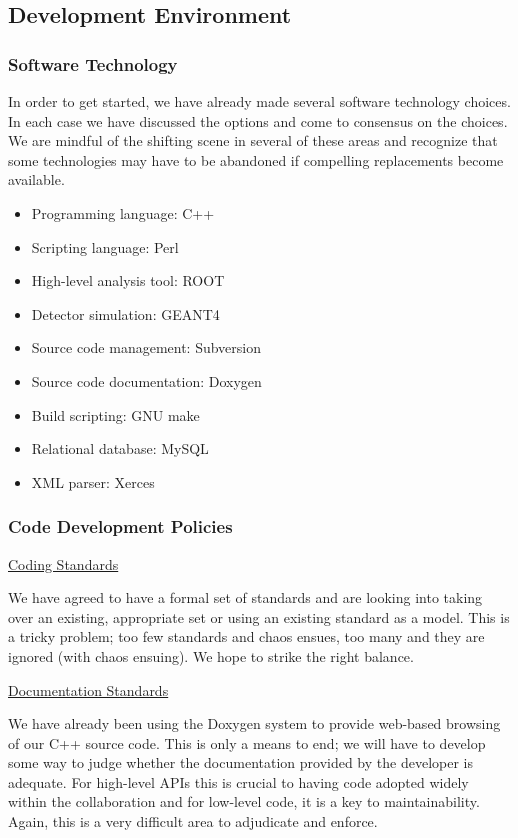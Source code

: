 \documentclass[12pt]{article}
\begin{document}
\subsection{Development Environment}

\subsubsection{Software Technology}

In order to get started, we have already made several software technology 
choices. In each case we have discussed the options and come to consensus on 
the choices. We are mindful of the shifting scene in several of these areas 
and recognize that some technologies may have to be abandoned if compelling 
replacements become available.

\begin{itemize}
\item Programming language: C++
\item Scripting language: Perl
\item High-level analysis tool: ROOT
\item Detector simulation: GEANT4
\item Source code management: Subversion
\item Source code documentation: Doxygen
\item Build scripting: GNU make
\item Relational database: MySQL
\item XML parser: Xerces
\end{itemize}

\subsubsection{Code Development Policies}

\noindent
\underline{Coding Standards}

We have agreed to have a formal set of standards and are looking into taking 
over an existing, appropriate set or using an existing standard as a model. 
This is a tricky problem; too few standards and chaos ensues, too many and 
they are ignored (with chaos ensuing). We hope to strike the right balance.

\vskip 0.3cm

\noindent
\underline{Documentation Standards}

We have already been using the Doxygen system to provide web-based browsing 
of our C++ source code. This is only a means to end; we will have to develop 
some way to judge whether the documentation provided by the developer is 
adequate. For high-level APIs this is crucial to having code adopted widely 
within the collaboration and for low-level code, it is a key to 
maintainability. Again, this is a very difficult area to adjudicate and 
enforce.
\end{document}
